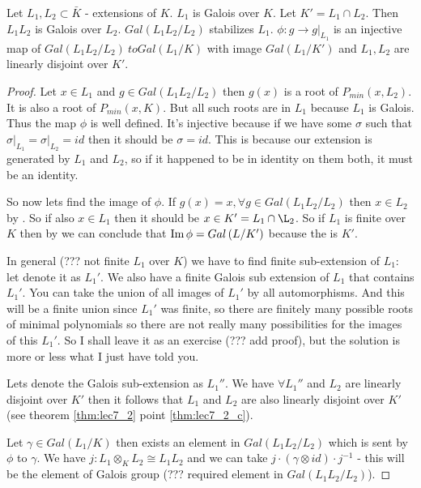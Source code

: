 \begin{theorem}
  Let $L_1, L_2 \subset \bar{K}$ - extensions of $K$. $L_1$ is Galois
  over $K$. Let $K' = L_1 \cap L_2$. Then $L_1 L_2$ is Galois over
  $L_2$. $Gal\left(L_1 L_2/ L_2\right)$ stabilizes $L_1$. $\phi: g \to
  \left.g\right|_{L_1}$ is an injective map of
  $Gal\left(L_1 L_2/ L_2\right) \ to Gal\left(L_1/ K\right)$ with
  image $Gal\left(L_1/K'\right)$ and $L_1, L_2$ are linearly disjoint
  over $K'$.
  \begin{proof}
    Let $x \in L_1$ and $g \in Gal\left(L_1 L_2/ L_2\right)$ then
    $g\left(x\right)$ is a root of $P_{min}\left(x, L_2\right)$. It is
    also a root of $P_{min}\left(x, K\right)$. But all such roots are
    in $L_1$ because $L_1$ is Galois. Thus the map $\phi$ is well
    defined. It's injective because if we have some $\sigma$ such that
    $\left. \sigma \right|_{L_1} = \left. \sigma \right|_{L_2} = id$
    then it should be $\sigma = id$. This is because our extension is
    generated by $L_1$ and $L_2$, so if it happened to be in identity
    on them both, it must be an identity.

    So now lets find the image of $\phi$. If $g\left(x\right) = x,
    \forall g \in Gal\left(L_1 L_2/ L_2\right)$ then $x \in L_2$ by
    . So if also $x \in L_1$ then it
    should be $x \in K' = L_1 \cap \L_2$. So if $L_1$ is finite over
    $K$ then by    we can conclude
    that $\operatorname{Im} \phi = Gal\left(L/K'\right)$ because the
     is $K'$.

    In general (??? not finite $L_1$ over $K$) we have to find finite
    sub-extension of $L_1$: let denote it as $L_1'$. We also have a
    finite Galois sub extension of $L_1$ that contains $L_1'$.
    You can take the union of all images of $L_1'$ by all
    automorphisms. And this will be a finite union since $L_1'$ was
    finite, so there are finitely many possible roots of minimal
    polynomials so there are not really many possibilities for the
    images of this $L_1'$. So I shall leave it as an exercise (??? add
    proof), but the
    solution is more or less what I just have told you.

    Lets denote the Galois sub-extension as $L_1''$. We have
    $\forall L_1''$ and $L_2$ are linearly disjoint over $K'$ then it follows
    that $L_1$ and $L_2$ are also linearly disjoint over $K'$
    (see theorem \ref{thm:lec7_2} point \ref{thm:lec7_2_c}).

    Let $\gamma \in Gal\left(L_1/K\right)$ then exists an element in
    $Gal\left(L_1 L_2/L_2\right)$ which is sent by $\phi$ to $\gamma$.
    We have $j: L_1 \otimes_K L_2 \cong L_1 L_2$ and we can take
    $j \cdot \left(\gamma \otimes id\right) \cdot j^{-1}$ - this will
    be the element of Galois group (??? required element in
    $Gal\left(L_1 L_2/L_2\right)$). 
  \end{proof}
  \label{thm:lec7_3}
\end{theorem}


